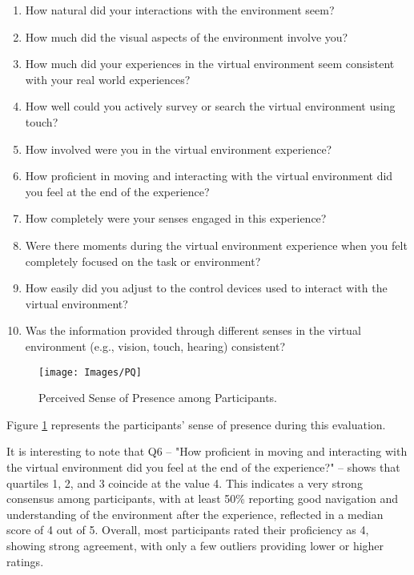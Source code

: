 \begin{enumerate}[label=Q\arabic* --]
    \item How natural did your interactions with the environment seem?
    \item How much did the visual aspects of the environment involve you?
    \item How much did your experiences in the virtual environment seem consistent with your real world experiences?
    \item How well could you actively survey or search the virtual environment using touch?
    \item How involved were you in the virtual environment experience?
    \item How proficient in moving and interacting with the virtual environment did you feel at the end of the experience?
    \item How completely were your senses engaged in this experience?
    \item Were there moments during the virtual environment experience when you felt completely focused on the task or environment?
    \item How easily did you adjust to the control devices used to interact with the virtual environment?
    \item Was the information provided through different senses in the virtual environment (e.g., vision, touch, hearing) consistent?
\end{enumerate}


\begin{figure}[h!]
    \centering
    \texttt{[image: Images/PQ]}
    \caption{Perceived Sense of Presence among Participants.} 
    \label{fig:PQ}
\end{figure}

Figure \ref{fig:PQ} represents the participants’ sense of presence during this evaluation.

It is interesting to note that Q6 – "How proficient in moving and interacting with the virtual environment did you feel at the end of the experience?" – shows that quartiles 1, 2, and 3 coincide at the value 4. 
This indicates a very strong consensus among participants, with at least 50\% reporting good navigation and understanding of the environment after the experience, reflected in a median score of 4 out of 5. 
Overall, most participants rated their proficiency as 4, showing strong agreement, with only a few outliers providing lower or higher ratings.

